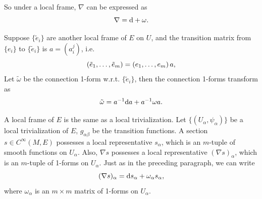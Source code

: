So under a local frame, $\nabla$ can be expressed as
\begin{equation*}
    \nabla = {\rm d} + \omega.
\end{equation*}
\begin{proposition}
    Suppose $\{\tilde{e}_i\}$ are another local frame of $E$ on $U$, 
    and the transition matrix from $\{e_i\}$ to $\{\tilde{e}_i\}$ is $a=(a_i^j)$, i.e.
    \begin{equation*}
        ({\tilde{e}}_{1},\dots,{\tilde{e}}_{m}) = ({e}_{1},\dots,{e}_{m})\, a,
    \end{equation*}
    Let $\tilde{\omega}$ be the connection 1-form w.r.t. $\{\tilde{e}_i\}$,
    then the connection 1-forms transform as
    \begin{equation*}
        \tilde{\omega} = a^{-1} {\rm d} a + a^{-1} \omega a.
    \end{equation*}
\end{proposition}

A local frame of $E$ is the same as a local trivialization. 
Let $\{(U_\alpha,\psi_\alpha)\}$ be a local trivialization of $E$, $g_{\alpha\beta}$ be the transition functions. 
A section $s\in C^\infty(M,E)$ possesses a local representative $s_\alpha$, which is an $m$-tuple of smooth functions on $U_\alpha$. 
Also, $\nabla s$ possesses a local representative $(\nabla s)_\alpha$, which is an $m$-tuple of 1-forms on $U_\alpha$. 
Just as in the preceding paragraph, we can write 
\begin{equation}\label{eq:local-expression-of-connection}
    (\nabla s)_\alpha = {\rm d} s_\alpha + \omega_\alpha s_\alpha,
\end{equation}
where $\omega_\alpha$ is an $m\times m$ matrix of 1-forms on $U_\alpha$. 

